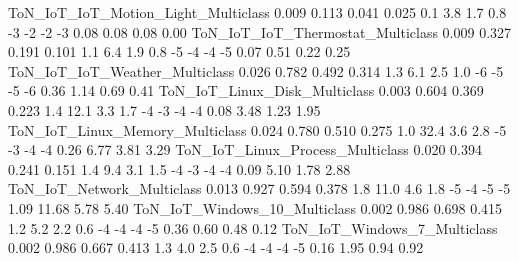 ToN_IoT_IoT_Motion_Light_Multiclass                                      0.009      0.113       0.041      0.025                   0.1                   3.8                    1.7                   0.8              -3              -2               -2              -3               0.08               0.08                0.08               0.00
ToN_IoT_IoT_Thermostat_Multiclass                                        0.009      0.327       0.191      0.101                   1.1                   6.4                    1.9                   0.8              -5              -4               -4              -5               0.07               0.51                0.22               0.25
ToN_IoT_IoT_Weather_Multiclass                                           0.026      0.782       0.492      0.314                   1.3                   6.1                    2.5                   1.0              -6              -5               -5              -6               0.36               1.14                0.69               0.41
ToN_IoT_Linux_Disk_Multiclass                                            0.003      0.604       0.369      0.223                   1.4                  12.1                    3.3                   1.7              -4              -3               -4              -4               0.08               3.48                1.23               1.95
ToN_IoT_Linux_Memory_Multiclass                                          0.024      0.780       0.510      0.275                   1.0                  32.4                    3.6                   2.8              -5              -3               -4              -4               0.26               6.77                3.81               3.29
ToN_IoT_Linux_Process_Multiclass                                         0.020      0.394       0.241      0.151                   1.4                   9.4                    3.1                   1.5              -4              -3               -4              -4               0.09               5.10                1.78               2.88
ToN_IoT_Network_Multiclass                                               0.013      0.927       0.594      0.378                   1.8                  11.0                    4.6                   1.8              -5              -4               -5              -5               1.09              11.68                5.78               5.40
ToN_IoT_Windows_10_Multiclass                                            0.002      0.986       0.698      0.415                   1.2                   5.2                    2.2                   0.6              -4              -4               -4              -5               0.36               0.60                0.48               0.12
ToN_IoT_Windows_7_Multiclass                                             0.002      0.986       0.667      0.413                   1.3                   4.0                    2.5                   0.6              -4              -4               -4              -5               0.16               1.95                0.94               0.92